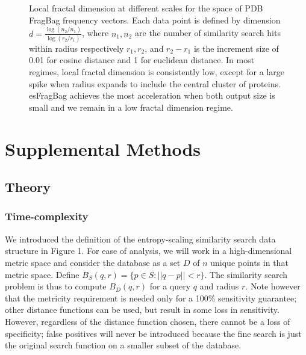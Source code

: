 \documentclass[review,preprint,12pt]{elsarticle}
\theoremstyle{definition}
\theoremstyle{remark}
\begin{document}
\begin{figure}[p]
{\begin{subfigure}[b]{3.4in}
    \end{subfigure}
    }
    \caption{Local fractal dimension at different scales for the space of PDB FragBag frequency vectors. Each data point is defined by dimension $d = \frac{\log(n_2/n_1)}{\log(r_2/r_1)}$, where $n_1, n_2$ are the number of similarity search hits within radius respectively $r_1, r_2$, and $r_2 - r_1$ is the increment size of 0.01 for cosine distance and 1 for euclidean distance. In most regimes, local fractal dimension is consistently low, except for a large spike when radius expands to include the central cluster of proteins. esFragBag achieves the most acceleration when both output size is small and we remain in a low fractal dimension regime.}
    \label{fig:fragbag_fractal}
\end{figure}

\section{Supplemental Methods}

\subsection{Theory}
\subsubsection{Time-complexity}
We introduced the definition of the entropy-scaling similarity search data structure in Figure 1.
For ease of analysis, we will work in a high-dimensional metric space and consider the database as a set $D$ of $n$ unique points in that metric space.
Define $B_S(q,r) = \{ p \in S : ||q-p||<r \}$. The similarity search problem is thus to compute $B_D(q,r)$ for a query $q$ and radius $r$.
Note however that the metricity requirement is needed only for a 100\% sensitivity guarantee; other distance functions can be used, but result in some loss in sensitivity.
However, regardless of the distance function chosen, there cannot be a loss of
specificity; false positives will never be introduced because the fine search is just the original search function on a smaller subset of the database.
\end{document}
